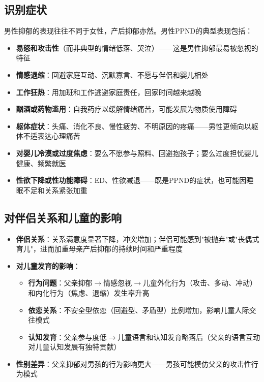 \documentclass[12pt,a4paper,twoside]{ctexbook}
\begin{document}
\subsection{识别症状}

男性抑郁的表现往往不同于女性，产后抑郁亦然。男性PPND的典型表现包括：

\begin{itemize}[leftmargin=2cm]
	\item \textbf{易怒和攻击性}（而非典型的情绪低落、哭泣）——这是男性抑郁最易被忽视的特征
	\item \textbf{情感退缩}：回避家庭互动、沉默寡言、不愿与伴侣和婴儿相处
	\item \textbf{工作狂热}：用加班和工作逃避家庭责任，回家时间越来越晚
	\item \textbf{酗酒或药物滥用}：自我药疗以缓解情绪痛苦，可能发展为物质使用障碍
	\item \textbf{躯体症状}：头痛、消化不良、慢性疲劳、不明原因的疼痛——男性更倾向以躯体不适表达心理痛苦
	\item \textbf{对婴儿冷漠或过度焦虑}：要么不愿参与照料、回避抱孩子；要么过度担忧婴儿健康、频繁就医
	\item \textbf{性欲下降或性功能障碍}：ED、性欲减退——既是PPND的症状，也可能因睡眠不足和关系紧张加重
\end{itemize}

\subsection{对伴侣关系和儿童的影响}

\begin{itemize}[leftmargin=2cm]
	\item \textbf{伴侣关系}：关系满意度显著下降，冲突增加；伴侣可能感到"被抛弃"或"丧偶式育儿"，进而加重母亲产后抑郁的持续时间和严重程度
	\item \textbf{对儿童发育的影响}：
	\begin{itemize}
		\item \textbf{行为问题}：父亲抑郁$\rightarrow$情感忽视$\rightarrow$儿童外化行为（攻击、多动、冲动）和内化行为（焦虑、退缩）发生率升高
		\item \textbf{依恋关系}：不安全型依恋（回避型、矛盾型）比例增加，影响儿童人际交往模式
		\item \textbf{认知发育}：父亲参与度低$\rightarrow$儿童语言和认知发育略落后（父亲的语言互动对儿童认知发展有独特贡献）
	\end{itemize}
	\item \textbf{性别差异}：父亲抑郁对男孩的行为影响更大——男孩可能模仿父亲的攻击性行为模式
\end{itemize}
\end{document}
